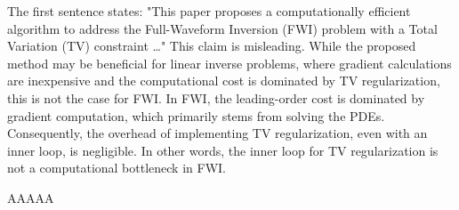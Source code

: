 \begin{point}
	The first sentence states: "This paper proposes a computationally efficient algorithm to address the Full-Waveform Inversion (FWI) problem with a Total Variation (TV) constraint …"
	This claim is misleading. While the proposed method may be beneficial for linear inverse problems, where gradient calculations are inexpensive and the computational cost is dominated by TV regularization, this is not the case for FWI. In FWI, the leading-order cost is dominated by gradient computation, which primarily stems from solving the PDEs. Consequently, the overhead of implementing TV regularization, even with an inner loop, is negligible. In other words, the inner loop for TV regularization is not a computational bottleneck in FWI.
\end{point}

\begin{reply}
AAAAA

\end{reply}
